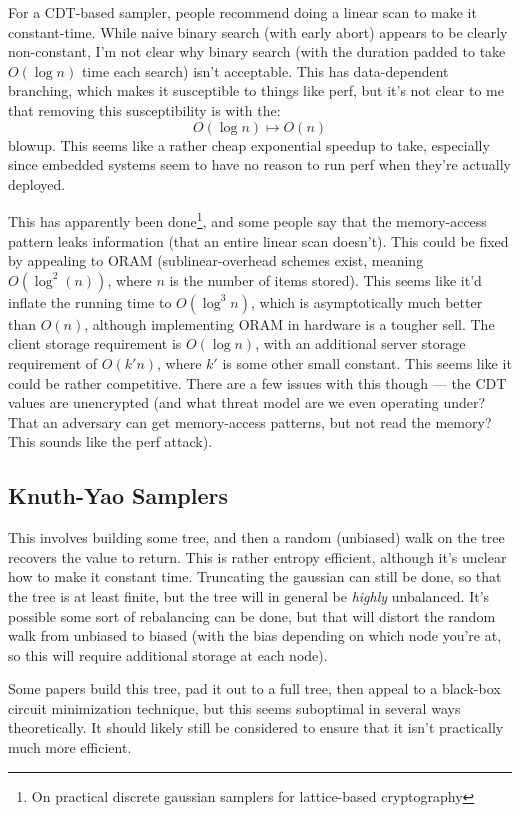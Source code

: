 \documentclass{article}
\begin{document}
For a CDT-based sampler, people recommend doing a linear scan to make it constant-time.
While naive binary search (with early abort) appears to be clearly non-constant, I'm not clear why binary search (with the duration padded to take $O(\log n)$ time each search) isn't acceptable.
This has data-dependent branching, which makes it susceptible to things like perf, but it's not clear to me that removing this susceptibility is with the:
\begin{equation}
O(\log n)\mapsto O(n)
\end{equation}
blowup.
This seems like a rather cheap exponential speedup to take, especially since embedded systems seem to have no reason to run perf when they're actually deployed.

This has apparently been done\footnote{On practical
discrete gaussian samplers for lattice-based cryptography}, and some people say that the memory-access pattern leaks information (that an entire linear scan doesn't).
This could be fixed by appealing to ORAM (sublinear-overhead schemes exist, meaning $O(\log^2(n))$, where $n$ is the number of items stored).
This seems like it'd inflate the running time to $O(\log^3 n)$, which is asymptotically much better than $O(n)$, although implementing ORAM in hardware is a tougher sell.
The client storage requirement is $O(\log n)$, with an additional server storage requirement of $O(k' n)$, where $k'$ is some other small constant.
This seems like it could be rather competitive.
There are a few issues with this though --- the CDT values are unencrypted (and what threat model are we even operating under?
That an adversary can get memory-access patterns, but not read the memory?
This sounds like the perf attack).
\subsection{Knuth-Yao Samplers}
This involves building some tree, and then a random (unbiased) walk on the tree recovers the value to return.
This is rather entropy efficient, although it's unclear how to make it constant time.
Truncating the gaussian can still be done, so that the tree is at least finite, but the tree will in general be \emph{highly} unbalanced.
It's possible some sort of rebalancing can be done, but that will distort the random walk from unbiased to biased (with the bias depending on which node you're at, so this will require additional storage at each node).

Some papers build this tree, pad it out to a full tree, then appeal to a black-box circuit minimization technique, but this seems suboptimal in several ways theoretically.
It should likely still be considered to ensure that it isn't practically much more efficient.
\end{document}
